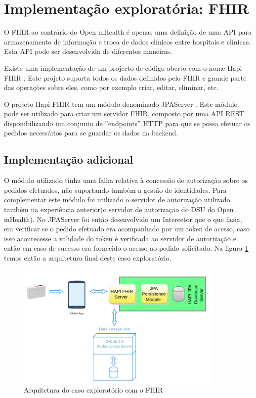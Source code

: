 \section{Implementação exploratória: FHIR}
O \gls{FHIR} ao contrário do Open mHealth é apenas uma definição de uma \gls{API} para armazenamento de informação e troca de dados clínicos entre hospitais e clínicas. Esta \gls{API} pode ser desenvolvida de diferentes maneiras. \par 
Existe uma implementação de um projecto de código aberto com o nome Hapi-FHIR . Este projeto suporta todos os dados definidos pelo \gls{FHIR} e grande parte das operações sobre eles, como por exemplo criar, editar, eliminar, etc.
\par 
O projeto Hapi-FHIR tem um módulo denominado JPAServer  \cite{jpa-server}. Este módulo pode ser utilizado para criar um servidor FHIR, composto por uma \gls{API} \gls{REST} disponibilizando um conjunto de ''endpoints'' \gls{HTTP} para que se possa efetuar os pedidos necessários para se guardar os dados na backend. \par

\subsection{Implementação adicional}
O módulo utilizado tinha uma falha relativa à concessão de autorização sobre os pedidos efetuados, não suportando também a gestão de identidades. Para complementar este módulo foi utilizado o servidor de autorização utilizado também na experiência anterior(o servidor de autorização do \gls{DSU} do Open mHealth).
No JPAServer foi então desenvolvido um Intercetor que o que fazia, era verificar se o pedido efetuado era acompanhado por um token de acesso, caso isso acontecesse a validade do token é verificada ao servidor de autorização e então em caso de sucesso era fornecido o acesso ao pedido solicitado. Na figura \ref{f:exp-fhir-arch} temos então a arquitetura final deste caso exploratório.
\begin{figure}[H]
  \centering
  \includegraphics[width=0.9\textwidth]{imgs/fhir-arch-exp.png}
  \caption[Arquitetura do caso exploratório com o FHIR]{Arquitetura do caso exploratório com o FHIR}
  
  \label{f:exp-fhir-arch}
\end{figure}

